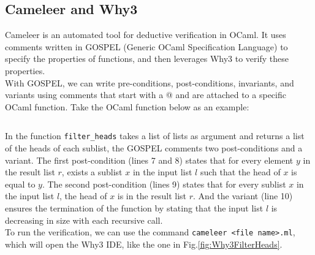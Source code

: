 \documentclass[runningheads]{llncs}
\begin{document}
\subsection{Cameleer and Why3}
Cameleer\autocite{pereiraCameleerDeductiveVerification2021} is an automated tool for deductive verification in OCaml. It uses comments written in GOSPEL\autocite{chargueraudGOSPELProvidingOCaml2019} (Generic OCaml Specification Language) to specify the properties of functions, and then leverages Why3\autocite{filliatreWhy3WherePrograms2013a} to verify these properties.\\
With GOSPEL, we can write pre-conditions, post-conditions, invariants, and variants using comments that start with a @ and are attached to a specific OCaml function. Take the OCaml function below as an example:
\inputminted[fontsize=\small,linenos,xleftmargin=20pt]{ocaml}{../../filter_heads/filter_heads.ml}
In the function \texttt{filter\_heads} takes a list of lists as argument and returns a list of the heads of each sublist, the GOSPEL comments two post-conditions and a variant.
The first post-condition (lines 7 and 8) states that for every element \( y \) in the result list \( r \), exists a sublist \( x \) in the input list \( l \) such that the head of \( x \) is equal to \( y \).
The second post-condition (lines 9) states that for every sublist \( x \) in the input list \( l \), the head of \( x \) is in the result list \( r \).
And the variant (line 10) ensures the termination of the function by stating that the input list \( l \) is decreasing in size with each recursive call.\\
To run the verification, we can use the command \texttt{cameleer <file name>.ml}, which will open the Why3 IDE, like the one in Fig.\ref{fig:Why3FilterHeads}.
\end{document}
